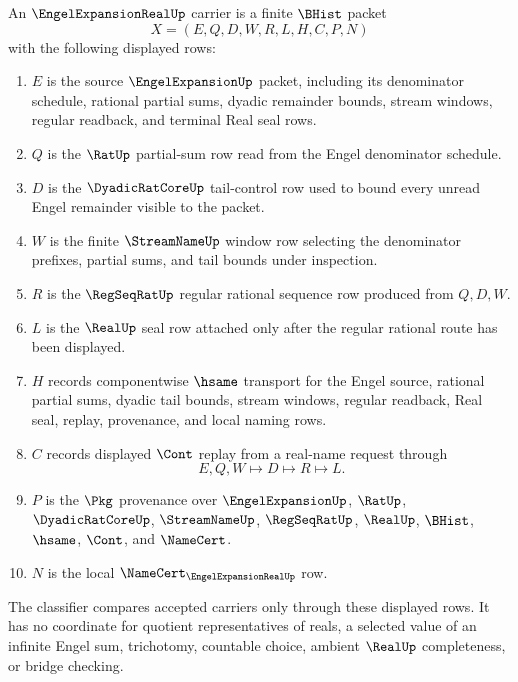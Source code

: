 \begin{definition}
\label{def:engel-expansion-real-carrier}
An $\EngelExpansionRealUp$ carrier is a finite $\BHist$ packet
$$
X=(E,Q,D,W,R,L,H,C,P,N)
$$
with the following displayed rows:
\begin{enumerate}
\item $E$ is the source $\EngelExpansionUp$ packet, including its denominator schedule, rational partial sums, dyadic remainder bounds, stream windows, regular readback, and terminal Real seal rows.
\item $Q$ is the $\RatUp$ partial-sum row read from the Engel denominator schedule.
\item $D$ is the $\DyadicRatCoreUp$ tail-control row used to bound every unread Engel remainder visible to the packet.
\item $W$ is the finite $\StreamNameUp$ window row selecting the denominator prefixes, partial sums, and tail bounds under inspection.
\item $R$ is the $\RegSeqRatUp$ regular rational sequence row produced from $Q,D,W$.
\item $L$ is the $\RealUp$ seal row attached only after the regular rational route has been displayed.
\item $H$ records componentwise $\hsame$ transport for the Engel source, rational partial sums, dyadic tail bounds, stream windows, regular readback, Real seal, replay, provenance, and local naming rows.
\item $C$ records displayed $\Cont$ replay from a real-name request through
$$
E,Q,W \longmapsto D \longmapsto R \longmapsto L .
$$
\item $P$ is the $\Pkg$ provenance over $\EngelExpansionUp$, $\RatUp$, $\DyadicRatCoreUp$, $\StreamNameUp$, $\RegSeqRatUp$, $\RealUp$, $\BHist$, $\hsame$, $\Cont$, and $\NameCert$.
\item $N$ is the local $\NameCert_{\EngelExpansionRealUp}$ row.
\end{enumerate}
The classifier compares accepted carriers only through these displayed rows. It has no coordinate for quotient representatives of reals, a selected value of an infinite Engel sum, trichotomy, countable choice, ambient $\RealUp$ completeness, or bridge checking.
\end{definition}

